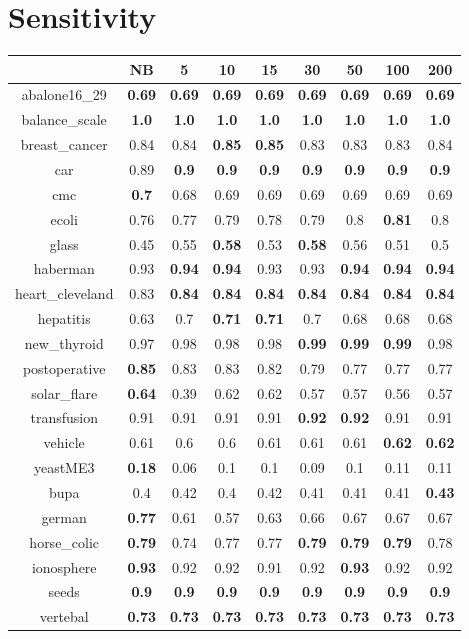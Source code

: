 \documentclass{article}%
\begin{document}
%
\section*{Sensitivity}%
\begin{tabular}{c|cccccccc}%
\hline%
&NB&5&10&15&30&50&100&200\\%
\hline%
abalone16\_29&\textbf{0.69}&\textbf{0.69}&\textbf{0.69}&\textbf{0.69}&\textbf{0.69}&\textbf{0.69}&\textbf{0.69}&\textbf{0.69}\\%
\hline%
balance\_scale&\textbf{1.0}&\textbf{1.0}&\textbf{1.0}&\textbf{1.0}&\textbf{1.0}&\textbf{1.0}&\textbf{1.0}&\textbf{1.0}\\%
\hline%
breast\_cancer&0.84&0.84&\textbf{0.85}&\textbf{0.85}&0.83&0.83&0.83&0.84\\%
\hline%
car&0.89&\textbf{0.9}&\textbf{0.9}&\textbf{0.9}&\textbf{0.9}&\textbf{0.9}&\textbf{0.9}&\textbf{0.9}\\%
\hline%
cmc&\textbf{0.7}&0.68&0.69&0.69&0.69&0.69&0.69&0.69\\%
\hline%
ecoli&0.76&0.77&0.79&0.78&0.79&0.8&\textbf{0.81}&0.8\\%
\hline%
glass&0.45&0.55&\textbf{0.58}&0.53&\textbf{0.58}&0.56&0.51&0.5\\%
\hline%
haberman&0.93&\textbf{0.94}&\textbf{0.94}&0.93&0.93&\textbf{0.94}&\textbf{0.94}&\textbf{0.94}\\%
\hline%
heart\_cleveland&0.83&\textbf{0.84}&\textbf{0.84}&\textbf{0.84}&\textbf{0.84}&\textbf{0.84}&\textbf{0.84}&\textbf{0.84}\\%
\hline%
hepatitis&0.63&0.7&\textbf{0.71}&\textbf{0.71}&0.7&0.68&0.68&0.68\\%
\hline%
new\_thyroid&0.97&0.98&0.98&0.98&\textbf{0.99}&\textbf{0.99}&\textbf{0.99}&0.98\\%
\hline%
postoperative&\textbf{0.85}&0.83&0.83&0.82&0.79&0.77&0.77&0.77\\%
\hline%
solar\_flare&\textbf{0.64}&0.39&0.62&0.62&0.57&0.57&0.56&0.57\\%
\hline%
transfusion&0.91&0.91&0.91&0.91&\textbf{0.92}&\textbf{0.92}&0.91&0.91\\%
\hline%
vehicle&0.61&0.6&0.6&0.61&0.61&0.61&\textbf{0.62}&\textbf{0.62}\\%
\hline%
yeastME3&\textbf{0.18}&0.06&0.1&0.1&0.09&0.1&0.11&0.11\\%
\hline%
bupa&0.4&0.42&0.4&0.42&0.41&0.41&0.41&\textbf{0.43}\\%
\hline%
german&\textbf{0.77}&0.61&0.57&0.63&0.66&0.67&0.67&0.67\\%
\hline%
horse\_colic&\textbf{0.79}&0.74&0.77&0.77&\textbf{0.79}&\textbf{0.79}&\textbf{0.79}&0.78\\%
\hline%
ionosphere&\textbf{0.93}&0.92&0.92&0.91&0.92&\textbf{0.93}&0.92&0.92\\%
\hline%
seeds&\textbf{0.9}&\textbf{0.9}&\textbf{0.9}&\textbf{0.9}&\textbf{0.9}&\textbf{0.9}&\textbf{0.9}&\textbf{0.9}\\%
\hline%
vertebal&\textbf{0.73}&\textbf{0.73}&\textbf{0.73}&\textbf{0.73}&\textbf{0.73}&\textbf{0.73}&\textbf{0.73}&\textbf{0.73}\\%
\hline%
\end{tabular}
\end{document}
